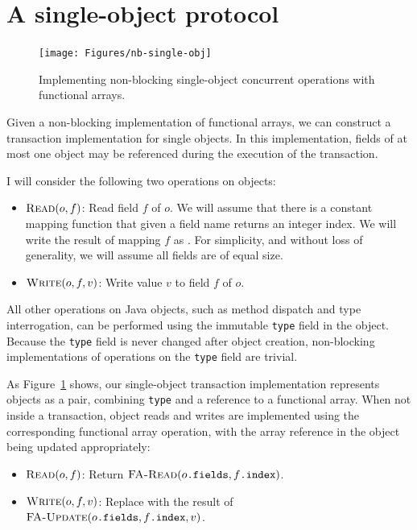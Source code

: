 \section{A single-object protocol}
\begin{figure}\centering
\texttt{[image: Figures/nb-single-obj]}
\caption{Implementing non-blocking single-object concurrent operations
  with functional arrays.}
\label{fig:single-o}
\end{figure}
Given a non-blocking implementation of functional arrays, we can
construct a transaction implementation for single objects.  In
this implementation, fields of at most one object may be referenced
during the execution of the transaction.

I will consider the following two operations on objects:
\begin{itemize}
\item $\text{\sc Read}(o, f)$: Read field $f$ of $o$.  We will assume that
  there is a constant mapping function that given a field name
  returns an integer index.  We will write the result of mapping $f$
  as .  For simplicity, and without loss of generality,
  we will assume all fields are of equal size.
\item $\text{\sc Write}(o, f, v)$: Write value $v$ to field $f$ of $o$.
\end{itemize}
All other operations on Java objects, such as method dispatch and type
interrogation, can be performed using the immutable {\tt type}
field in the object.  Because the {\tt type} field is never changed
after object creation, non-blocking implementations of operations on
the {\tt type} field are trivial.

As Figure~\ref{fig:single-o} shows, our single-object transaction
implementation represents objects as a pair, combining {\tt type} and a
reference to a functional array.  When not inside a transaction,
object reads and writes are implemented using the
corresponding functional array operation, with the array reference in
the object being updated appropriately:
\begin{itemize}
\item $\text{\sc Read}(o, f)$:
  Return $\text{\sc FA-Read}(o\text{\tt .fields}, f\text{\tt .index})$.
\item $\text{\sc Write}(o, f, v)$: Replace  with the
  result of \linebreak
  $\text{\sc FA-Update}(o\text{\tt .fields}, f\text{\tt .index}, v)$.
\end{itemize}

